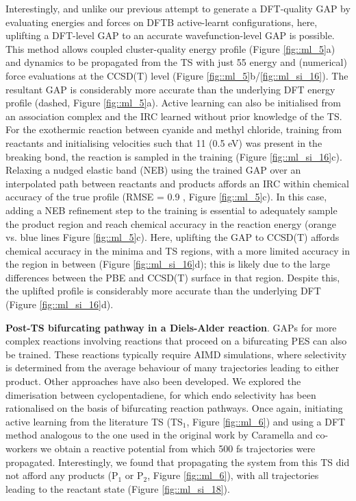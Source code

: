 \documentclass[../../main.tex]{subfiles}
\begin{document}
Interestingly, and unlike our previous attempt to generate a DFT-quality GAP by evaluating energies and forces on DFTB active-learnt configurations, here, uplifting a DFT-level GAP to an accurate wavefunction-level GAP is possible. This method allows coupled cluster-quality energy profile (Figure \ref{fig::ml_5}a) and dynamics to be propagated from the TS with just 55 energy and (numerical) force evaluations at the CCSD(T) level (Figure \ref{fig::ml_5}b/\ref{fig::ml_si_16}). The resultant GAP is considerably more accurate than the underlying DFT energy profile (dashed, Figure \ref{fig::ml_5}a). Active learning can also be initialised from an association complex and the IRC learned without prior knowledge of the TS. For the exothermic reaction between cyanide and methyl chloride, training from reactants and initialising velocities such that 11 \kcalx (0.5 eV) was present in the breaking bond, the reaction is sampled in the training (Figure \ref{fig::ml_si_16}c). Relaxing a nudged elastic band (NEB) using the trained GAP over an interpolated path between reactants and products affords an IRC within chemical accuracy of the true profile (RMSE = 0.9 \kcal, Figure \ref{fig::ml_5}c). In this case, adding a NEB refinement step to the training is essential to adequately sample the product region and reach chemical accuracy in the reaction energy (orange vs. blue lines Figure \ref{fig::ml_5}c). Here, uplifting the GAP to CCSD(T) affords chemical accuracy in the minima and TS regions, with a more limited accuracy in the region in between (Figure \ref{fig::ml_si_16}d); this is likely due to the large differences between the PBE and CCSD(T) surface in that region. Despite this, the uplifted profile is considerably more accurate than the underlying DFT (Figure \ref{fig::ml_si_16}d).


{\bfseries{Post-TS bifurcating pathway in a Diels-Alder reaction}}.  GAPs for more complex reactions involving reactions that proceed on a bifurcating PES can also be trained. These reactions typically require AIMD simulations, where selectivity is determined from the average behaviour of many trajectories leading to either product. Other approaches have also been developed.\cite{Lee2020} We explored the dimerisation between cyclopentadiene, for which endo selectivity has been rationalised on the basis of bifurcating reaction pathways.\cite{Caramella2002} Once again, initiating active learning from the literature TS (TS${}_1$, Figure \ref{fig::ml_6}) and using a DFT method analogous to the one used in the original work by Caramella and co-workers we obtain a reactive potential from which 500 fs trajectories were propagated. Interestingly, we found that propagating the system from this TS did not afford any products (P${}_1$ or P${}_2$, Figure \ref{fig::ml_6}), with all trajectories leading to the reactant state (Figure \ref{fig::ml_si_18}).
\end{document}
